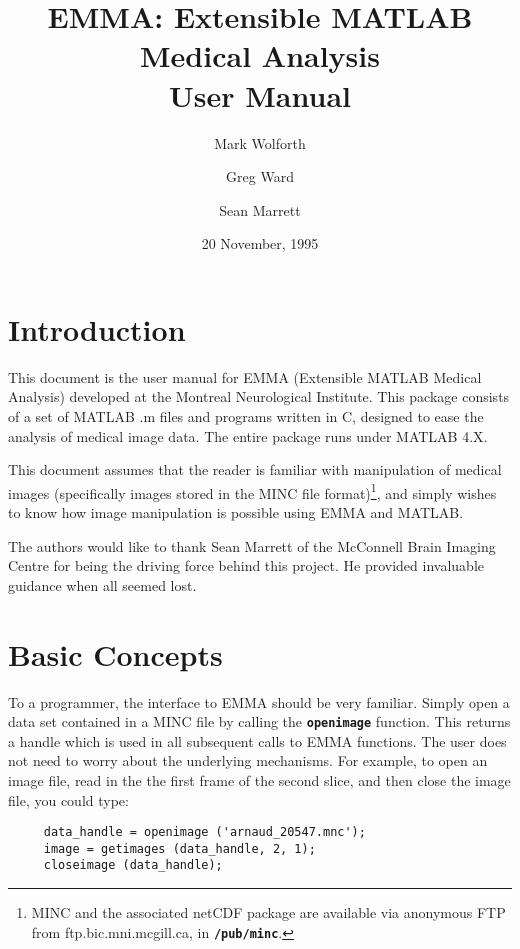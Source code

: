 \documentclass[11pt]{article}
\title{EMMA: Extensible MATLAB Medical Analysis \\ User Manual}
\author{Mark Wolforth \and Greg Ward \and Sean Marrett}
\date{20 November, 1995}
\def\code#1{{\tt \bf #1}}
\begin{document}
 

\maketitle
\newpage

\tableofcontents

\newpage
\section{Introduction}


This document is the user manual for EMMA (Extensible MATLAB Medical
Analysis) developed at the Montreal Neurological Institute.  This
package consists of a set of MATLAB .m files and programs written in
C, designed to ease the analysis of medical image data.  The entire
package runs under MATLAB 4.X.

This document assumes that the reader is familiar with manipulation of
medical images (specifically images stored in the MINC file
format)\footnote{MINC and the associated netCDF package are available
via anonymous FTP from ftp.bic.mni.mcgill.ca, in \code{/pub/minc}.},
and simply wishes to know how image manipulation is possible using EMMA
and MATLAB.

The authors would like to thank Sean Marrett of the McConnell Brain
Imaging Centre for being the driving force behind this project.  He
provided invaluable guidance when all seemed lost.

\newpage
\section{Basic Concepts}

To a programmer, the interface to EMMA should be very familiar.
Simply open a data set contained in a MINC file by calling the
\code{openimage} function.  This returns a handle which is used in all
subsequent calls to EMMA functions.  The user does not need to worry
about the underlying mechanisms.  For example, to open an image file,
read in the the first frame of the second slice, and then close the
image file, you could type:

%
\begin{verbatim}
     data_handle = openimage ('arnaud_20547.mnc');
     image = getimages (data_handle, 2, 1); 
     closeimage (data_handle);
\end{verbatim}
%
\end{document}
